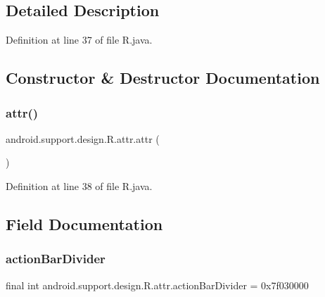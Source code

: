\subsection{Detailed Description}


Definition at line 37 of file R.\+java.



\subsection{Constructor \& Destructor Documentation}
\mbox{\label{classandroid_1_1support_1_1design_1_1_r_1_1attr_a7f12ec98c2c59686a0c06a82f577c051}} 
\subsubsection{\texorpdfstring{attr()}{attr()}}
{\footnotesize\ttfamily android.\+support.\+design.\+R.\+attr.\+attr (\begin{DoxyParamCaption}{ }\end{DoxyParamCaption})\hspace{0.3cm}{\ttfamily [private]}}



Definition at line 38 of file R.\+java.


\begin{DoxyCode}{0}

\end{DoxyCode}


\subsection{Field Documentation}
\mbox{\label{classandroid_1_1support_1_1design_1_1_r_1_1attr_ae760bb3759dc75e0a49d12b13a525863}} 
\subsubsection{\texorpdfstring{actionBarDivider}{actionBarDivider}}
{\footnotesize\ttfamily final int android.\+support.\+design.\+R.\+attr.\+action\+Bar\+Divider = 0x7f030000\hspace{0.3cm}{\ttfamily [static]}}



